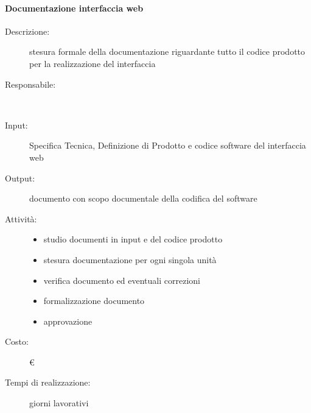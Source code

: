 \paragraph{Documentazione interfaccia web}
\begin{description}
\item[Descrizione:] stesura formale della documentazione riguardante tutto il codice prodotto
per la realizzazione del interfaccia \\

\item[Responsabile:] \\

\item[Input:] Specifica Tecnica, Definizione di Prodotto e codice software del interfaccia web\\

\item[Output:] documento con scopo documentale della codifica del software\\

\item[Attività:]
\begin{itemize}
\item studio documenti in input e del codice prodotto
\item stesura documentazione per ogni singola unità
\item verifica documento ed eventuali correzioni
\item formalizzazione documento
\item approvazione
\end{itemize}
\item[Costo:] \euro \\
\item[Tempi di realizzazione:]  giorni lavorativi
\end{description}



